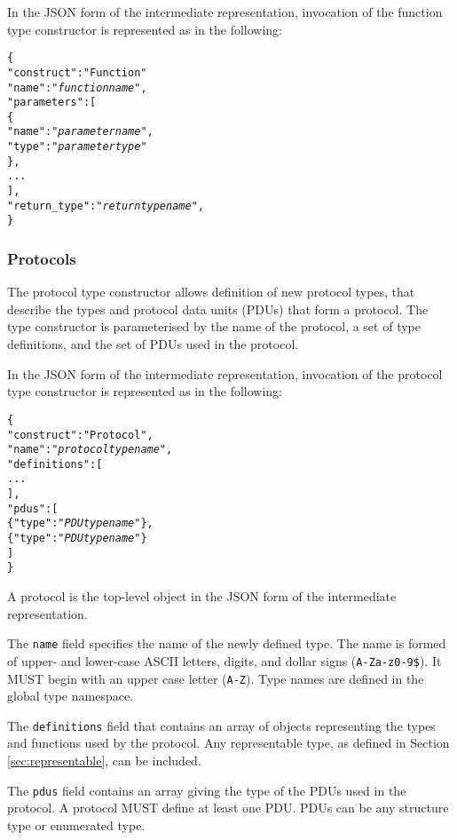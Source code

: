 \documentclass[10pt,twocolumn,a4paper]{article}
\newcommand{\code}[1]{\texttt{#1}}
\begin{document}
In the JSON form of the intermediate representation, invocation of the
function type constructor is represented as in the following:
\footnotesize
\begin{alltt}
  \{
    "construct"    : "Function"
    "name"         : "\emph{function name}",
    "parameters"   : [
      \{
        "name" : "\emph{parameter name}",
        "type" : "\emph{parameter type}"
      \},
      ...
    ],
    "return\_type"  : "\emph{return type name}",
  \}
\end{alltt}
\normalsize

\subsubsection{Protocols}

The protocol type constructor allows definition of new protocol types, that
describe the types and protocol data units (PDUs) that form a protocol. The
type constructor is parameterised by the name of the protocol, a set of
type definitions, and the set of PDUs used in the protocol.

In the JSON form of the intermediate representation, invocation of the
protocol type constructor is represented as in the following:
\footnotesize
\begin{alltt}
  \{
    "construct"   : "Protocol",
    "name"        : "\emph{protocol type name}",
    "definitions" : [
                      ...
                    ],
    "pdus"        : [
      \{"type" : "\emph{PDU type name}"\},
      \{"type" : "\emph{PDU type name}"\}
    ]
  \}
\end{alltt}
\normalsize
A protocol is the top-level object in the JSON form of the intermediate
representation.

The \code{name} field specifies the name of the newly defined type. The
name is formed of upper- and lower-case ASCII letters, digits, and dollar
signs (\code{A-Za-z0-9\$}).  It MUST begin with an upper case letter
(\code{A-Z}). Type names are defined in the global type namespace.

The \code{definitions} field that contains an array of objects representing
the types and functions used by the protocol. Any representable type, as
defined in Section \ref{sec:representable}, can be included.

The \code{pdus} field contains an array giving the type of the PDUs used
in the protocol. A protocol MUST define at least one PDU. PDUs can be any
structure type or enumerated type. 
\end{document}
